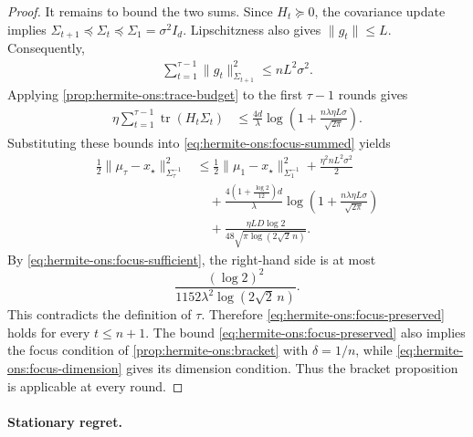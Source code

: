 \documentclass{article}
\theoremstyle{plain}
\theoremstyle{definition}
\theoremstyle{plain}
\newcommand{\tr}{\operatorname{tr}}
\begin{document}
\begin{proof}
    It remains to bound the two sums. Since $H_t\succeq0$, the
    covariance update implies $\Sigma_{t+1}\preceq\Sigma_t\preceq\Sigma_1 = \sigma^2I_d$.
    Lipschitzness also gives $\|g_t\|\leq L$. Consequently,
    \begin{align}
        \sum_{t=1}^{\tau-1}
        \|g_t\|_{\Sigma_{t+1}}^2
        \leq
        nL^2\sigma^2.
        \label{eq:hermite-ons:focus-gradient-budget}
    \end{align}
    Applying \cref{prop:hermite-ons:trace-budget} to the first
    $\tau-1$ rounds gives
    \begin{align}
        \eta\sum_{t=1}^{\tau-1}
        \tr(H_t\Sigma_t)
         & \leq
        \frac{4d}{\lambda}
        \log\left(
        1+
        \frac{n\lambda\eta L\sigma}{\sqrt{2\pi}}
        \right).
        \label{eq:hermite-ons:focus-trace-budget}
    \end{align}
    Substituting these bounds into
    \eqref{eq:hermite-ons:focus-summed} yields
    \begin{align}
        \frac12
        \|\mu_\tau-x_\star\|_{\Sigma_\tau^{-1}}^2
         & \leq
        \frac12
        \|\mu_1-x_\star\|_{\Sigma_1^{-1}}^2
        +
        \frac{\eta^2nL^2\sigma^2}{2}
        \nonumber \\
         & \quad+
        \frac{
            4\left(1+\frac{\log2}{12}\right)d
        }{\lambda}
        \log\left(
        1+
        \frac{n\lambda\eta L\sigma}{\sqrt{2\pi}}
        \right)
        \nonumber \\
         & \quad+
        \frac{\eta LD\log2}
        {48\sqrt{\pi\log(2\sqrt2\,n)}}.
    \end{align}
    By \eqref{eq:hermite-ons:focus-sufficient}, the right-hand side is
    at most
    \[
        \frac{(\log2)^2}
        {1152\lambda^2\log(2\sqrt2\,n)}.
    \]
    This contradicts the definition of $\tau$. Therefore
    \eqref{eq:hermite-ons:focus-preserved} holds for every
    $t\leq n+1$.
    The bound \eqref{eq:hermite-ons:focus-preserved} also implies the
    focus condition of \cref{prop:hermite-ons:bracket} with
    $\delta=1/n$, while
    \eqref{eq:hermite-ons:focus-dimension} gives its dimension
    condition. Thus the bracket proposition is applicable at every
    round.
\end{proof}


\paragraph{Stationary regret.}
\end{document}
